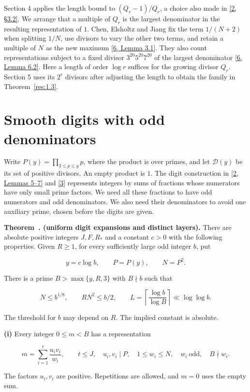 \documentclass[11pt,a4paper]{article}
\newcounter{result}[section]
\renewcommand{\theresult}{\thesection.\arabic{result}}
\newcommand{\paperstatement}[3]{%
  \refstepcounter{result}\label{res:#2}%
  \noindent\textbf{#1~\theresult#3.}\enspace\ignorespaces}
\begin{document}
Section 4 applies the length bound to $(Q_r-1)/Q_r$, a choice also made in \hyperlink{ref-2}{[2, \S{}3.2]}. We arrange that a multiple of $Q_r$ is the largest denominator in the resulting representation of $1$. Chen, Elsholtz and Jiang fix the term $1/(N+2)$ when splitting $1/N$, use divisors to vary the other two terms, and retain a multiple of $N$ as the new maximum \hyperlink{ref-6}{[6, Lemma 3.1]}. They also count representations subject to a fixed divisor $3^{20}5^{20}7^{20}$ of the largest denominator \hyperlink{ref-6}{[6, Lemma 6.2]}. Here a length of order $\log r$ suffices for the growing divisor $Q_r$. Section 5 uses its $2^r$ divisors after adjusting the length to obtain the family in Theorem~\ref{res:1.3}.

\section{Smooth digits with odd denominators}

Write $P(y)=\prod_{3\le p\le y}p$, where the product is over primes, and let $\mathcal D(y)$ be its set of positive divisors. An empty product is $1$. The digit construction in \hyperlink{ref-2}{[2, Lemmas 5–7]} and \hyperlink{ref-3}{[3]} represents integers by sums of fractions whose numerators have only small prime factors. We need all these fractions to have odd numerators and odd denominators. We also need their denominators to avoid one auxiliary prime, chosen before the digits are given.

\paperstatement{Theorem}{2.1}{ (uniform digit expansions and distinct layers)} There are absolute positive integers $J,F,R_*$ and a constant $c>0$ with the following properties. Given $R\ge1$, for every sufficiently large odd integer $b$, put

\[
y=c\log b,\qquad P=P(y),\qquad N=P^2.
\]

There is a prime $B>\max\{y,R,3\}$ with $B\nmid b$ such that

\[
N\le b^{1/8},\qquad RN^2\le b/2,\qquad
L=\left\lceil\frac{\log b}{\log B}\right\rceil\ll\log\log b .
\]

The threshold for $b$ may depend on $R$. The implied constant is absolute.

\textbf{(i)} Every integer $0\le m<B$ has a representation

\[
m=\sum_{i=1}^{t}\frac{u_i v_i}{w_i},\qquad
t\le J,\quad u_i,v_i\mid P,\quad 1\le w_i\le N,\quad w_i\ \text{odd},\quad B\nmid w_i .
\]

The factors $u_i,v_i$ are positive. Repetitions are allowed, and $m=0$ uses the empty sum.
\end{document}
